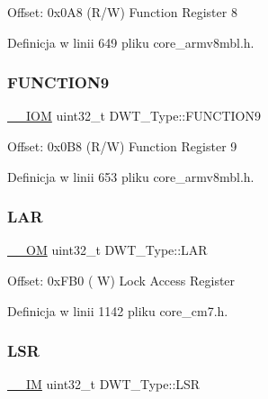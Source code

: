 Offset\+: 0x0\+A8 (R/W) Function Register 8 

Definicja w linii 649 pliku core\+\_\+armv8mbl.\+h.

\mbox{\label{struct_d_w_t___type_a379b5b8f7d40003b7bdabd535e0378a1}} 
\subsubsection{\texorpdfstring{F\+U\+N\+C\+T\+I\+O\+N9}{FUNCTION9}}
{\footnotesize\ttfamily \hyperlink{core__sc300_8h_ab6caba5853a60a17e8e04499b52bf691}{\+\_\+\+\_\+\+I\+OM} uint32\+\_\+t D\+W\+T\+\_\+\+Type\+::\+F\+U\+N\+C\+T\+I\+O\+N9}

Offset\+: 0x0\+B8 (R/W) Function Register 9 

Definicja w linii 653 pliku core\+\_\+armv8mbl.\+h.

\mbox{\label{struct_d_w_t___type_a4b8037802a3b25e367f0977d86f754ad}} 
\subsubsection{\texorpdfstring{L\+AR}{LAR}}
{\footnotesize\ttfamily \hyperlink{core__sc300_8h_a0ea2009ed8fd9ef35b48708280fdb758}{\+\_\+\+\_\+\+OM} uint32\+\_\+t D\+W\+T\+\_\+\+Type\+::\+L\+AR}

Offset\+: 0x\+F\+B0 ( W) Lock Access Register 

Definicja w linii 1142 pliku core\+\_\+cm7.\+h.

\mbox{\label{struct_d_w_t___type_a4281befcc19ee69afdd50801cb1c9bcf}} 
\subsubsection{\texorpdfstring{L\+SR}{LSR}}
{\footnotesize\ttfamily \hyperlink{core__sc300_8h_a4cc1649793116d7c2d8afce7a4ffce43}{\+\_\+\+\_\+\+IM} uint32\+\_\+t D\+W\+T\+\_\+\+Type\+::\+L\+SR}

